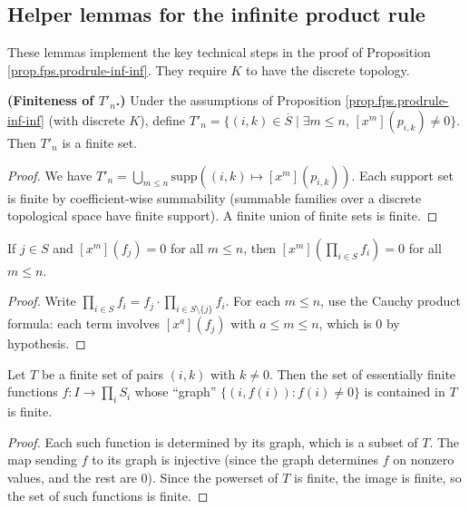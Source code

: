 \subsection{Helper lemmas for the infinite product rule}

These lemmas implement the key technical steps in the proof of Proposition
\ref{prop.fps.prodrule-inf-inf}. They require $K$ to have the discrete topology.

\begin{lemma}
\label{lem.fps.T'n-finite-discrete}
\leanhelper
\leanok
\textbf{(Finiteness of $T'_n$.)}
Under the assumptions of Proposition \ref{prop.fps.prodrule-inf-inf}
(with discrete $K$), define
$T'_n = \{(i,k)\in\overline{S} \mid \exists m\le n,\, [x^m](p_{i,k})\ne 0\}$.
Then $T'_n$ is a finite set.
\end{lemma}

\begin{proof}
We have $T'_n = \bigcup_{m\le n}
\mathrm{supp}\!\left((i,k)\mapsto [x^m](p_{i,k})\right)$.
Each support set is finite by coefficient-wise summability
(summable families over a discrete topological space have finite support).
A finite union of finite sets is finite.
\end{proof}

\begin{lemma}
\label{lem.fps.coeff-prod-zero-of-factor-coeff-zero}
\leanhelper
\leanok
If $j\in S$ and $[x^m](f_j) = 0$ for all $m\le n$, then
$[x^m]\!\left(\prod_{i\in S} f_i\right) = 0$ for all $m\le n$.
\end{lemma}

\begin{proof}
\leanok
Write $\prod_{i\in S} f_i = f_j \cdot \prod_{i\in S\setminus\{j\}} f_i$.
For each $m\le n$, use the Cauchy product formula: each term
involves $[x^a](f_j)$ with $a\le m\le n$, which is $0$ by hypothesis.
\end{proof}

\begin{lemma}
\label{lem.fps.finite-funcs-graph-in-finite-set}
\leanhelper
\leanok
Let $T$ be a finite set of pairs $(i,k)$ with $k\ne 0$.
Then the set of essentially finite functions $f : I\to\prod_i S_i$
whose ``graph'' $\{(i,f(i)) : f(i)\ne 0\}$ is contained in $T$
is finite.
\end{lemma}

\begin{proof}
\leanok
Each such function is determined by its graph, which is a subset of $T$.
The map sending $f$ to its graph is injective (since the graph determines $f$
on nonzero values, and the rest are $0$). Since the powerset of $T$ is finite,
the image is finite, so the set of such functions is finite.
\end{proof}

